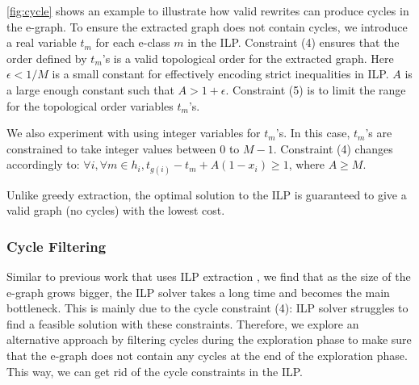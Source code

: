 \autoref{fig:cycle} shows an example to illustrate how valid rewrites can produce cycles in the e-graph.
To ensure the extracted graph does not contain cycles, we introduce a real variable $t_m$ for each e-class $m$ in the ILP.
Constraint (4) ensures that the order defined by $t_m$'s is a valid topological order for the extracted graph.
Here $\epsilon < 1/M$ is a small constant for effectively encoding strict inequalities in ILP.
$A$ is a large enough constant such that $A > 1 + \epsilon$.
Constraint (5) is to limit the range for the topological order variables $t_m$'s.

We also experiment with using integer variables for $t_m$'s. In this case, $t_m$'s are constrained to take integer values between 0 to $M-1$.
Constraint (4) changes accordingly to: $\forall i, \forall m \in h_i, t_{g(i)} - t_m + A (1 - x_i) \geq 1$, where $A \geq M$.

Unlike greedy extraction, the optimal solution to the ILP is guaranteed to give a valid graph (no cycles) with the lowest cost.


\subsubsection{Cycle Filtering}
\label{sec:cycle}

Similar to previous work that uses ILP extraction \cite{eqsat, spores},
we find that as the size of the e-graph grows bigger, the ILP solver takes a long time and becomes the main bottleneck.
This is mainly due to the cycle constraint (4): ILP solver struggles to find a feasible solution with these constraints.
Therefore, we explore an alternative approach by filtering cycles during the exploration phase to make sure that the e-graph does not contain any cycles at the end of the exploration phase.
This way, we can get rid of the cycle constraints in the ILP.

